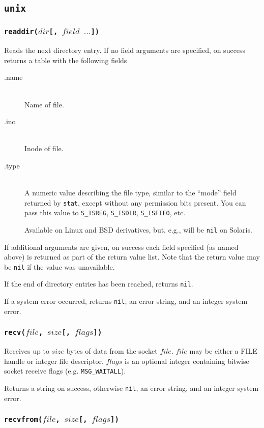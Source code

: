 \documentclass[11pt, oneside]{memoir}
\newcommand*{\nil}[0]{\texttt{nil}\xspace}
\newcommand*{\syscall}[1]{\texttt{#1}\xspace}
\newcommand*{\fn}[1]{\texttt{#1}\xspace}
\newcommand*{\otherwise}[1]{otherwise #1, an error string, and an integer system error}
\newcounter{toccols}
\newenvironment{Module}[1]{
	\subsection{\texttt{#1}}
	\addtocontents{toc}{
		\protect\begin{multicols}{\value{toccols}}
	}
}{
	\addtocontents{toc}{\protect\end{multicols}}
}
\begin{document}
\begin{Module}{unix}
\subsubsection[\fn{readdir}]{\fn{readdir($dir$[, $field$ $\ldots$])}}

Reads the next directory entry. If no field arguments are specified, on success returns a table with the following fields

\begin{description}
\item[.name] \hfill \\
Name of file.
\item[.ino] \hfill \\
Inode of file.
\item[.type] \hfill \\
A numeric value describing the file type, similar to the ``mode'' field returned by \syscall{stat}, except without any permission bits present. You can pass this value to \fn{S\_ISREG}, \fn{S\_ISDIR}, \fn{S\_ISFIFO}, etc.

Available on Linux and BSD derivatives, but, e.g., will be \nil on Solaris.
\end{description}

If additional arguments are given, on success each field specified (as named above) is returned as part of the return value list. Note that the return value may be \nil if the value was unavailable.

If the end of directory entries has been reached, returns \nil.

If a system error occurred, returns \nil, an error string, and an integer system error.

\subsubsection[\fn{recv}]{\fn{recv($file$, $size$[, $flags$])}}

Receives up to $size$ bytes of data from the socket $file$. $file$ may be either a FILE handle or integer file descriptor. $flags$ is an optional integer containing bitwise socket receive flags (e.g. \texttt{MSG\_WAITALL}).

Returns a string on success, \otherwise{\nil}.

\subsubsection[\fn{recvfrom}]{\fn{recvfrom($file$, $size$[, $flags$])}}


\end{Module}
\end{document}
